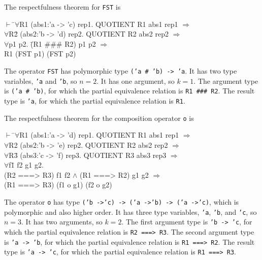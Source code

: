 \documentclass[envcountsame,runningheads]{llncs}
\newcommand{\quotient}{partial equivalence}
\begin{document}
The respectfulness theorem for {\tt FST} is
{\tt \begin{tabbing}
\hspace{5.5mm}
    $\vdash$ \=$\forall$R1 (abs1:'a -> 'c) rep1. QUOTIENT R1 abs1 rep1 $\Rightarrow$ \\
\>     $\forall$R\=2 (abs2:'b -> 'd) rep2. QUOTIENT R2 abs2 rep2 $\Rightarrow$ \\
\>\>     $\forall$p1 p2. \=(R1 \#\#\# R2) p1 p2 $\Rightarrow$ \\
\>\>\>           R1 (FST p1) (FST p2)
\end{tabbing}}
The operator {\tt FST} has polymorphic type {\tt ('a \# 'b) -> 'a}.
It has two type variables, {\tt 'a} and {\tt 'b}, so $n = 2$.
It has one argument, so $k = 1$.
The argument type is
{\tt ('a \# 'b)},
for which
the \quotient{} relation
is {\tt R1 \#\#\# R2}.
The result type is
{\tt 'a},
for which
the \quotient{} relation
is {\tt R1}.

The respectfulness theorem for the composition operator {\tt o} is
{\tt \begin{tabbing}
\hspace{5.5mm}
    $\vdash$ \=$\forall$R1 (abs1:'a -> 'd) rep1. QUOTIENT R1 abs1 rep1 $\Rightarrow$ \\
\>     $\forall$R2 (abs2:'b -> 'e) rep2. QUOTIENT R2 abs2 rep2 $\Rightarrow$ \\
\>     $\forall$R\=3 (abs3:'c -> 'f) rep3. QUOTIENT R3 abs3 rep3 $\Rightarrow$ \\
\>\>     $\forall$f\=1 f2 g1 g2. \\
\>\>\>     (R2 ===> R3) f1 f2 $\wedge$ (R1 ===> R2) g1 g2 $\Rightarrow$ \\
\>\>\>     (R1 ===> R3) (f1 o g1) (f2 o g2)
\end{tabbing}}
The operator {\tt o} has type
{\tt ('b ->\;'c) -> ('a ->\;'b) -> ('a ->\;'c)},
which is polymorphic and also higher order.
It has three type variables, {\tt 'a}, {\tt 'b}, and {\tt 'c}, so $n = 3$.
It has two arguments, so $k = 2$.
The first argument type is
{\tt 'b -> 'c},
for which
the \quotient{} relation
is {\tt R2 ===> R3}.
The second argument type is
{\tt 'a -> 'b},
for which
the \quotient{} relation
is {\tt R1 ===> R2}.
The result type is
{\tt 'a -> 'c},
for which
the \quotient{} relation
is {\tt R1 ===> R3}.
\end{document}
